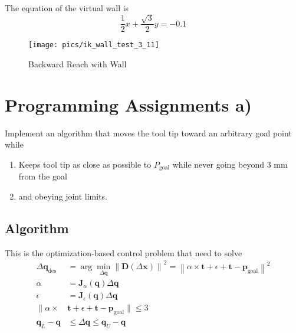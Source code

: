 \documentclass[english,10pt,a4paper]{book}
\begin{document}
		The equation of the virtual wall is 
		\begin{equation*}
			\frac{1}{2}x + \frac{\sqrt{3}}{2}y = -0.1
		\end{equation*}
		
		\begin{figure}[H]
			\centering
			\texttt{[image: pics/ik\_wall\_test\_3\_11]}
			\caption{Backward Reach with Wall}
		\end{figure}
		\section{Programming Assignments a)}
		Implement an algorithm that moves the tool tip toward an arbitrary goal point while
		\begin{enumerate}\label{requirements1}
			\item Keeps tool tip as close as possible to $P_{\text{goal}}$ while never going beyond 3 mm from the goal
			\item and obeying joint limits.
		\end{enumerate}
		\subsection{Algorithm}
		This is the optimization-based control problem that need to solve \cite{Lynch_Park_2017}
		\begin{equation}
			\begin{aligned}
				\Delta \mathbf{q}_{\text{des}} &= \arg \min_{\Delta \mathbf{q}} \left\| \mathbf{D}(\Delta \mathbf{x}) \right\|^2 = \left\| \alpha \times \mathbf{t} + \epsilon + \mathbf{t} - \mathbf{p}_{\text{goal}} \right\|^2\\
				\alpha &= \mathbf{J}_{\alpha}(\mathbf{q}) \Delta \mathbf{q} \\
				\epsilon &= \mathbf{J}_{\epsilon}(\mathbf{q}) \Delta \mathbf{q} \\
				\| \alpha \times &\mathbf{t} + \epsilon + \mathbf{t} - \mathbf{p}_{\text{goal}} \| \leq 3 \\
				\mathbf{q}_L - \mathbf{q} &\leq \Delta \mathbf{q} \leq \mathbf{q}_U - \mathbf{q}
			\end{aligned}
		\end{equation}
		
\end{document}
